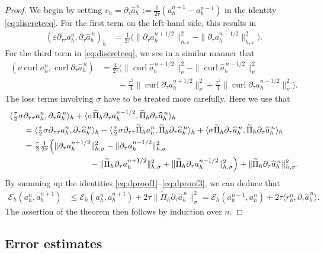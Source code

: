 \documentclass[12pt,reqno,a4paper]{amsart}
\theoremstyle{definition}
\def\EE{\mathscr{E}}
\def\dtautau{\partial_{\tau\tau}}
\def\dtau{\partial_{\tau}}
\def\curl{\operatorname{curl}}
\def\wPi{\widetilde\Pi}
\def\a{{a}}
\def\r{{r}}
\def\wh{\widehat}
\def\la{\langle}
\def\ra{\rangle}
\begin{document}
\begin{proof}
We begin by setting $v_h = \dtau \wh\a_h^{\,n}:=\frac{1}{2\tau}(\a_h^{n+1}-\a_h^{n-1})$ in the identity \eqref{eq:discreteeq}.
For the first term on the left-hand side, this results in
\begin{align}\label{eq:dproof1}
(\varepsilon \dtautau\a_h^n,\dtau \wh\a_h^{\,n})_h &= \frac{1}{2\tau}\big(\|\dtau\a_h^{n+1/2}\|_{h,\varepsilon}^2-\|\dtau\a_h^{n-1/2}\|_{h,\varepsilon}^2\big).
\end{align}
For the third term in \eqref{eq:discreteeq}, we see in a similar manner that
\begin{align}\label{eq:dproof2}
(\nu\curl\a_h^n,\curl \dtau \wh\a_h^{\,n})
&=\tfrac{1}{2\tau}\Big(\|\curl \wh\a_h^{\,n+1/2}\|^2_{\nu} -\|\curl \wh\a_h^{\,n-1/2}\|^2_{\nu} \\
&\qquad-\tfrac{\tau^2}{4}\|\curl\dtau\a_h^{n+1/2}\|^2_{\nu} + \tfrac{\tau^2}{4}\|\curl\dtau\a_h^{n-1/2}\|^2_{\nu} \Big). \nonumber
\end{align}
The loss terms involving $\sigma$ have to be treated more carefully. Here we use that
\begin{align} \label{eq:dproof3} 
\la\tfrac{\tau}{2}\sigma &\dtautau\a_h^n,\dtau \wh\a_h^{\,n}\ra_h + \la\sigma\wPi_h \dtau \a_h^{n-1/2}, \wPi_h \dtau \wh\a_h^{\,n}\ra_h \\
&= \la \tfrac\tau2\sigma \dtautau\a_h^n,\dtau \wh\a_h^{\,n}\ra_h - \la\tfrac\tau2\sigma \dtautau \wPi_h\a_h^n,\wPi_h \dtau  \wh\a_h^{\,n}\ra_h + \la\sigma\wPi_h \dtau \wh\a_h^{\,n},\wPi_h \dtau \wh\a_h^{\,n}\ra_h \notag \\
& = \tfrac\tau2 \tfrac1{2\tau}\Big(\|\dtau\a_h^{n+1/2}\|_{h,\sigma}^2 - \|\dtau\a_h^{n-1/2}\|_{h,\sigma}^2  \notag \\
& \qquad \qquad \qquad \qquad 
-\|\wPi_h \dtau \a_h^{n+1/2}\|_{h,\sigma}^2
 + \|\wPi_h \dtau \a_h^{n-1/2}\|_{h,\sigma}^2 \Big) + 
 \|\wPi_h \dtau \wh\a_h^{\,n}\|_{h,\sigma}^2. \notag
\end{align}
By summing up the identities \eqref{eq:dproof1}--\eqref{eq:dproof3}, we can deduce that 
\begin{align*}
\EE_h(\a_h^n,\a_h^{n+1}) &\le \EE_h(\a_h^n,\a_h^{n+1}) + 2\tau\|\wPi_h \dtau \wh\a_h^{\,n}\|_{\sigma}^2 
= \EE_h(\a_h^{n-1},\a_h^n) + 2\tau \la\r_h^n,\dtau\wh\a_h^{\,n}\ra.
\end{align*}
The assertion of the theorem then follows by induction over $n$.
\end{proof}


\subsection{Error estimates}
\end{document}
